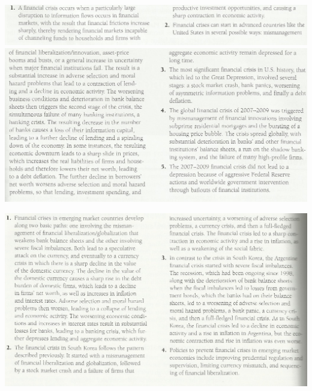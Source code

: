 \documentclass[12pt]{examnotes}
\begin{document}
\begin{center}
  \includegraphics[scale=0.5]{./imgs/c9sum1.jpg}
    \includegraphics[scale=0.5]{./imgs/c9sum2.jpg}
\end{center}

\begin{center}
  \includegraphics[scale=0.5]{./imgs/c10sum.jpg}
\end{center}
\end{document}
